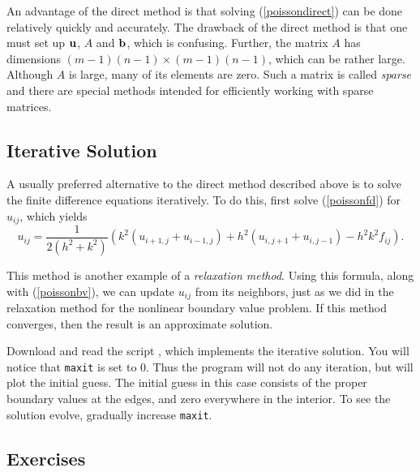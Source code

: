 An advantage of the direct method is that solving (\ref{poissondirect})
can be done relatively quickly and accurately.
The drawback of the direct method is that one must set up $\mathbf{u}$,
$A$ and $\mathbf{b}$, which is confusing. Further, the matrix $A$ has dimensions
$(m-1)(n-1) \times (m-1)(n-1)$, which can be rather large.
Although $A$ is large, many of its elements are zero. Such a matrix
is called {\em sparse} and there are special methods intended for
efficiently working with sparse matrices.


\subsection*{Iterative Solution}

A usually preferred alternative to the direct method described above is
to solve the finite difference equations iteratively. To do this,
first solve (\ref{poissonfd}) for $u_{ij}$, which yields
\begin{equation}\label{poissonit}
 u_{ij} = \frac{1}{2(h^2+k^2)} \left( k^2 (u_{i+1,j} + u_{i-1,j})
          + h^2 (u_{i,j+1} + u_{i,j-1})
          - h^2 k^2 f_{ij} \right) .
\end{equation}

This method is another example of a {\em relaxation method}.
Using this formula, along with (\ref{poissonbv}), we can update
$u_{ij}$ from its neighbors, just as we did in the relaxation method
for the nonlinear boundary value problem.  If this method converges,
then the result is an approximate solution.

Download and read the script , which implements the iterative solution.
You
will notice that \verb&maxit& is set to $0$. Thus the program will not
do any iteration, but will plot the initial guess. The initial guess
in this case consists of the proper boundary values at the edges, and
zero everywhere in the interior.  To see the solution evolve,
gradually increase \verb&maxit&.


\subsection*{Exercises}


